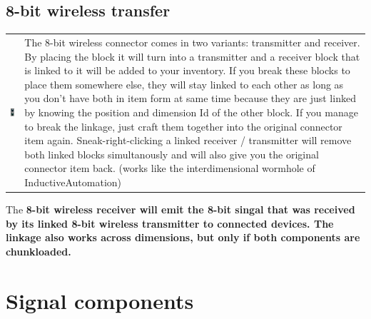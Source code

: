 \documentclass[11pt]{article} %
\makeatletter
\newcommand{\imgtex}{\begin{tabularx}{\textwidth}{@{}c@{ }X@{}}}
\makeatother
\begin{document}
\subsection{8-bit wireless transfer}
\imgtex
\includegraphics[align = t]{wireless_8_bit} & The 8-bit wireless connector comes in two variants: transmitter and receiver. By placing the block it will turn into a transmitter and a receiver block that is linked to it will be added to your inventory. If you break these blocks to place them somewhere else, they will stay linked to each other as long as you don't have both in item form at same time because they are just linked by knowing the position and dimension Id of the other block. If you manage to break the linkage, just craft them together into the original connector item again. Sneak-right-clicking a linked receiver / transmitter will remove both linked blocks simultanously and will also give you the original connector item back. (works like the interdimensional wormhole of InductiveAutomation)\\
\end{tabularx}
The \bf 8-bit wireless receiver \rm will emit the 8-bit singal that was received by its linked \bf 8-bit wireless transmitter \rm to connected devices. The linkage also works across dimensions, but only if both components are chunkloaded.

\section{Signal components}
\end{document}
